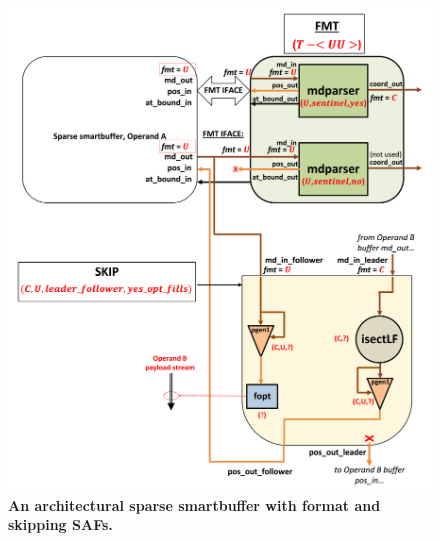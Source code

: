 \begin{figure}[ht]
\includegraphics[width=\textwidth]{figures/safinference_build_11skiptopology.png}
\caption{\textbf{An architectural sparse smartbuffer with format and skipping SAFs.}}
\label{fig:safinference_build_11skiptopology}
\centering
\end{figure}

